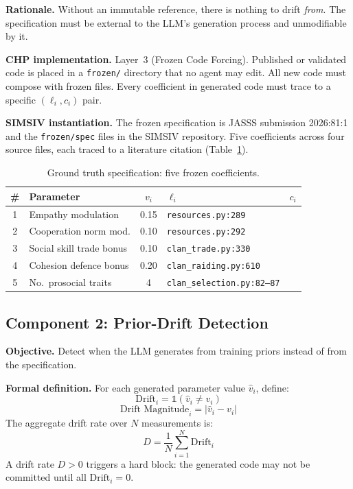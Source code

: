 \documentclass[11pt,a4paper]{article}
\begin{document}
\textbf{Rationale.} Without an immutable reference, there is nothing to drift \textit{from}. The specification must be external to the LLM's generation process and unmodifiable by it.

\textbf{CHP implementation.} Layer~3 (Frozen Code Forcing). Published or validated code is placed in a \texttt{frozen/} directory that no agent may edit. All new code must compose with frozen files. Every coefficient in generated code must trace to a specific $(\ell_i, c_i)$ pair.

\textbf{SIMSIV instantiation.} The frozen specification is JASSS submission 2026:81:1 and the \texttt{frozen/spec} files in the SIMSIV repository. Five coefficients across four source files, each traced to a literature citation (Table~\ref{tab:groundtruth}).

\begin{table}[ht]
\centering
\caption{Ground truth specification: five frozen coefficients.}
\label{tab:groundtruth}
\begin{tabular}{@{}clcll@{}}
\toprule
\# & Parameter & $v_i$ & $\ell_i$ & $c_i$ \\
\midrule
1 & Empathy modulation & 0.15 & \texttt{resources.py:289} & \citet{dewaal2008} \\
2 & Cooperation norm mod. & 0.10 & \texttt{resources.py:292} & \citet{boyd1985} \\
3 & Social skill trade bonus & 0.10 & \texttt{clan\_trade.py:330} & \citet{wiessner1982} \\
4 & Cohesion defence bonus & 0.20 & \texttt{clan\_raiding.py:610} & \citet{bowles2006} \\
5 & No.\ prosocial traits & 4 & \texttt{clan\_selection.py:82--87} & \citet{price1970} \\
\bottomrule
\end{tabular}
\end{table}

\subsection{Component 2: Prior-Drift Detection}

\textbf{Objective.} Detect when the LLM generates from training priors instead of from the specification.

\textbf{Formal definition.} For each generated parameter value $\hat{v}_i$, define:
\begin{equation}
\text{Drift}_i = \mathbb{1}(\hat{v}_i \neq v_i)
\end{equation}
\begin{equation}
\text{Drift Magnitude}_i = |\hat{v}_i - v_i|
\end{equation}
The aggregate drift rate over $N$ measurements is:
\begin{equation}
D = \frac{1}{N} \sum_{i=1}^{N} \text{Drift}_i
\end{equation}
A drift rate $D > 0$ triggers a hard block: the generated code may not be committed until all $\text{Drift}_i = 0$.
\end{document}
